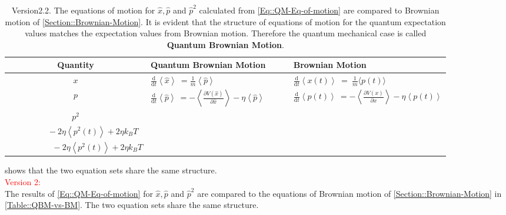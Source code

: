 	\begin{table}[h]
		\centering
		\caption{Version2.2. The equations of motion for  $\hat{x}, \hat{p}$ and $\hat{p}^2$ calculated from  \autoref{Eq::QM-Eq-of-motion} are compared to Brownian motion of \autoref{Section::Brownian-Motion}. It is evident that the structure of equations of motion for the quantum expectation values matches the expectation values from Brownian motion. Therefore the quantum mechanical case is called \textbf{Quantum Brownian Motion}.}
		\renewcommand{\arraystretch}{1.7}
		\begin{tabular}{c l l}
			\toprule
			Quantity & Quantum Brownian Motion $\qquad$  & Brownian Motion \\
			\midrule
			$x$ & $\frac{\text{d}}{\text{d}t} \left \langle \hat{x} \right \rangle \hspace{3pt}=	\frac{1}{m} \left\langle \hat{p} \right \rangle$ & $\frac{\text{d}}{\text{d}t} \left \langle {x}(t) \right \rangle \hspace{3pt}  =	~\frac{1}{m} \langle {p}(t) \rangle $ \\
			$p$ & $\frac{\text{d}}{\text{d}t} \left \langle \hat{p} \right \rangle ~= - 	\left\langle  \frac{\partial V(\hat{x})}{\partial \hat{x}} \right \rangle - \eta \left \langle \hat{p} \right \rangle$ &	$\frac{\text{d}}{\text{d}t} \left \langle {p}(t) \right \rangle ~=	- 	\left \langle \frac{\partial V({x})}{\partial {x}} \right \rangle - \eta \left \langle {p}(t) \right \rangle$ \\
			$p^2$ & \makecell[l]{$\frac{\text{d}}{\text{d}t} \left \langle \hat{p}^2 \right \rangle =	- \left\langle \hat{p} \frac{\partial V(\hat{x})}{\partial \hat{x}} + \frac{\partial V(\hat{x})}{\partial \hat{x}} \hat{p} \right \rangle$ \\ $ \qquad \qquad \hspace{2pt} - 2 \eta \left \langle {p}^2(t) \right \rangle + 2 \eta k_B T$} & \makecell[l]{$\frac{\text{d}}{\text{d}t} \left \langle {p}^2(t) \right \rangle = - \left\langle 2 {p}(t) \frac{\partial V({x})}{\partial {x}}\right \rangle $ \\ $ \qquad \qquad \hspace{3pt} \quad - 2 \eta \left \langle {p}^2(t) \right \rangle + 2 \eta k_B T$}\\
			\bottomrule
		\end{tabular}
		\label{Table::QBM-vs-BM}
	\end{table} \renewcommand{\arraystretch}{1.2}
	shows that the two equation sets share the same structure.\\
	\textcolor{red}{Version 2:}\\
	The results of \autoref{Eq::QM-Eq-of-motion} for $\hat{x}, \hat{p}$ and $\hat{p}^2$ are compared to the equations of Brownian motion of \autoref{Section::Brownian-Motion} in \autoref{Table::QBM-vs-BM}. The two equation sets share the same structure. \\
	
